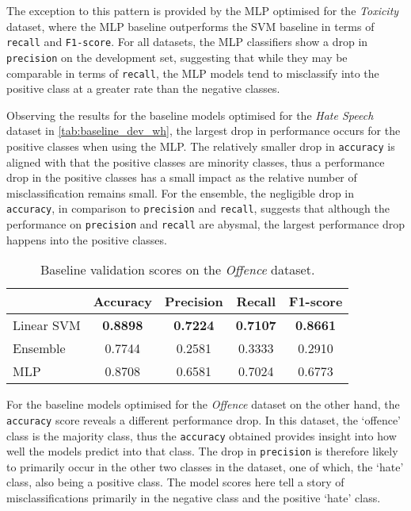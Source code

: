 The exception to this pattern is provided by the MLP optimised for the \textit{Toxicity} dataset, where the MLP baseline outperforms the SVM baseline in terms of \texttt{recall} and \texttt{F1-score}.
For all datasets, the MLP classifiers show a drop in \texttt{precision} on the development set, suggesting that while they may be comparable in terms of \texttt{recall}, the MLP models tend to misclassify into the positive class at a greater rate than the negative classes.

Observing the results for the baseline models optimised for the \textit{Hate Speech} dataset in \cref{tab:baseline_dev_wh}, the largest drop in performance occurs for the positive classes when using the MLP.
The relatively smaller drop in \texttt{accuracy} is aligned with that the positive classes are minority classes, thus a performance drop in the positive classes has a small impact as the relative number of misclassification remains small.
For the ensemble, the negligible drop in \texttt{accuracy}, in comparison to \texttt{precision} and \texttt{recall}, suggests that although the performance on \texttt{precision} and \texttt{recall} are abysmal, the largest performance drop happens into the positive classes.

\begin{table}[h]
  \centering
  \begin{tabular}{l|cccc}
               & Accuracy        & Precision       & Recall          & F1-score        \\ \hline
    Linear SVM & \textbf{0.8898} & \textbf{0.7224} & \textbf{0.7107} & \textbf{0.8661} \\
    Ensemble   & 0.7744          & 0.2581          & 0.3333          & 0.2910          \\
    MLP        & 0.8708          & 0.6581          & 0.7024          & 0.6773
  \end{tabular}
  \caption{Baseline validation scores on the \textit{Offence} dataset.}
  \label{tab:baseline_dev_davidson}
\end{table}

For the baseline models optimised for the \textit{Offence} dataset on the other hand, the \texttt{accuracy} score reveals a different performance drop.
In this dataset, the `offence' class is the majority class, thus the \texttt{accuracy} obtained provides insight into how well the models predict into that class.
The drop in \texttt{precision} is therefore likely to primarily occur in the other two classes in the dataset, one of which, the `hate' class, also being a positive class.
The model scores here tell a story of misclassifications primarily in the negative class and the positive `hate' class.

